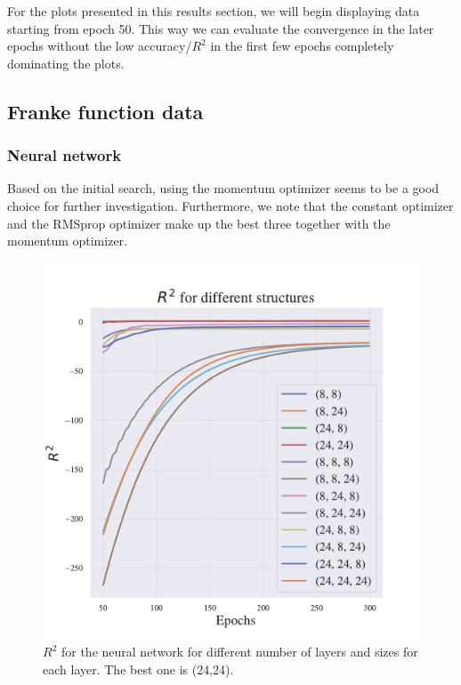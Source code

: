 For the plots presented in this results section, we will begin displaying data starting from epoch 50.
This way we can evaluate the convergence in the later epochs without the low accuracy/$R^2$ in the first few epochs completely dominating the plots.

\subsection{Franke function data}

\subsubsection{Neural network}

Based on the initial search, using the momentum optimizer seems to be a good choice for further investigation.
Furthermore, we note that the constant optimizer and the RMSprop optimizer make up the best three together with the momentum optimizer.

\begin{figure}[h!]
    \centering
    \includegraphics[width=1.0\linewidth]{project_2/figures/$R^2$ for different structures_continuous.pdf}
    \caption{$R^2$ for the neural network for different number of layers and sizes for each layer. The best one is (24,24).}
    \label{fig:structure_franke}
\end{figure}

